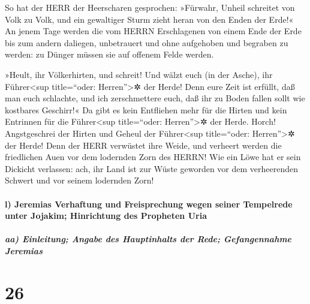 So hat der HERR der Heerscharen gesprochen: »Fürwahr,
Unheil schreitet von Volk zu Volk, und ein gewaltiger Sturm zieht heran
von den Enden der Erde!« An jenem Tage werden die vom
HERRN Erschlagenen von einem Ende der Erde bis zum andern daliegen,
unbetrauert und ohne aufgehoben und begraben zu werden: zu Dünger müssen
sie auf offenem Felde werden.

»Heult, ihr Völkerhirten, und schreit! Und wälzt euch (in
der Asche), ihr Führer\textless sup title=``oder: Herren''\textgreater✲
der Herde! Denn eure Zeit ist erfüllt, daß man euch schlachte, und ich
zerschmettere euch, daß ihr zu Boden fallen sollt wie kostbares
Geschirr!« Da gibt es kein Entfliehen mehr für die Hirten
und kein Entrinnen für die Führer\textless sup title=``oder:
Herren''\textgreater✲ der Herde. Horch! Angstgeschrei der
Hirten und Geheul der Führer\textless sup title=``oder:
Herren''\textgreater✲ der Herde! Denn der HERR verwüstet ihre Weide,
und verheert werden die friedlichen Auen vor dem
lodernden Zorn des HERRN! Wie ein Löwe hat er sein
Dickicht verlassen: ach, ihr Land ist zur Wüste geworden vor dem
verheerenden Schwert und vor seinem lodernden Zorn!

\hypertarget{l-jeremias-verhaftung-und-freisprechung-wegen-seiner-tempelrede-unter-jojakim-hinrichtung-des-propheten-uria}{%
\paragraph{l) Jeremias Verhaftung und Freisprechung wegen seiner
Tempelrede unter Jojakim; Hinrichtung des Propheten
Uria}\label{l-jeremias-verhaftung-und-freisprechung-wegen-seiner-tempelrede-unter-jojakim-hinrichtung-des-propheten-uria}}

\hypertarget{aa-einleitung-angabe-des-hauptinhalts-der-rede-gefangennahme-jeremias}{%
\subparagraph{aa) Einleitung; Angabe des Hauptinhalts der Rede;
Gefangennahme
Jeremias}\label{aa-einleitung-angabe-des-hauptinhalts-der-rede-gefangennahme-jeremias}}

\hypertarget{section-25}{%
\section{26}\label{section-25}}

